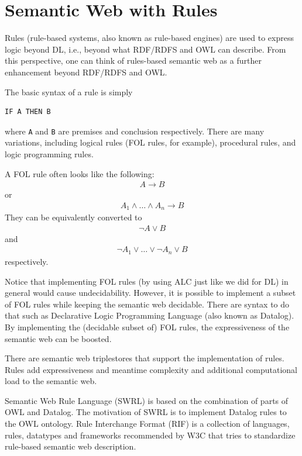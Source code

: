 \section{Semantic Web with Rules}

Rules (rule-based systems, also known as rule-based engines) are used to express logic beyond DL, i.e., beyond what RDF/RDFS and OWL can describe. From this perspective, one can think of rules-based semantic web as a further enhancement beyond RDF/RDFS and OWL.

The basic syntax of a rule is simply
\begin{lstlisting}
IF A THEN B
\end{lstlisting}
where \verb|A| and \verb|B| are premises and conclusion respectively. There are many variations, including logical rules (FOL rules, for example), procedural rules, and logic programming rules.

A FOL rule often looks like the following:
\begin{eqnarray}
	A \rightarrow B \nonumber
\end{eqnarray}
or
\begin{eqnarray}
	A_1 \land \ldots \land A_n \rightarrow B \nonumber
\end{eqnarray}
They can be equivalently converted to
\begin{eqnarray}
	\neg A \lor B \nonumber
\end{eqnarray}
and
\begin{eqnarray}
	\neg A_1 \lor \ldots \lor \neg A_n \lor B \nonumber
\end{eqnarray}
respectively. 

Notice that implementing FOL rules (by using ALC just like we did for DL) in general would cause undecidability. However, it is possible to implement a subset of FOL rules while keeping the semantic web decidable. There are syntax to do that such as Declarative Logic Programming Language (also known as Datalog). By implementing the (decidable subset of) FOL rules, the expressiveness of the semantic web can be boosted.

There are semantic web triplestores that support the implementation of rules. Rules add expressiveness and meantime complexity and additional computational load to the semantic web.

Semantic Web Rule Language (SWRL) is based on the combination of parts of OWL and Datalog. The motivation of SWRL is to implement Datalog rules to the OWL ontology. Rule Interchange Format (RIF) is a collection of languages, rules, datatypes and frameworks recommended by W3C that tries to standardize rule-based semantic web description. 

